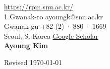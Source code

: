 \documentclass{cv} %
\begin{document}
 \hfill \href{https://rpm.snu.ac.kr/}{https://rpm.snu.ac.kr/}\\
1 Gwanak-ro \hfill ayoungk@snu.ac.kr\\
Gwanak-gu \hfill +82 (2)~$\cdot$~880~$\cdot$~1669\\
Seoul, S. Korea \hfill \href{https://scholar.google.com/citations?user=7yveufgAAAAJ&hl=en}{Google Scholar}\\

\hfil{\namesize\bf Ayoung Kim}\hfil

%





%


%
%

\newpage


%
%



\vspace{0.5in}
\hfill Revised \today
\end{document}
